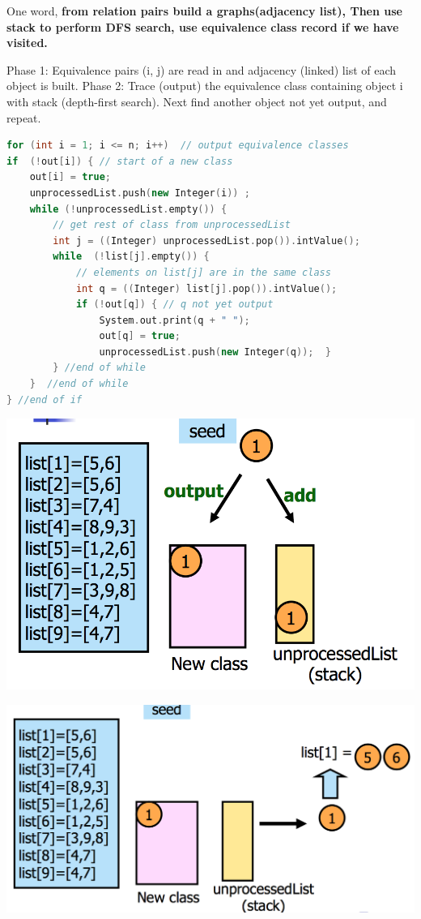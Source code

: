 \documentclass[a4paper,11pt,twoside]{book}
\begin{document}
	
	
	\par One word, \textbf{from relation pairs build a graphs(adjacency list), Then use stack to perform DFS search, use equivalence class record if we have visited.}
	
	
	
	Phase 1: Equivalence pairs (i, j) are read in and adjacency (linked) list of each object is built. Phase 2: Trace (output) the equivalence class containing object i with stack (depth-first search). Next find another object not yet output, and repeat.
	
\begin{lstlisting}[frame=single, language=c++, basicstyle=\scriptsize]
for (int i = 1; i <= n; i++)  // output equivalence classes
if  (!out[i]) { // start of a new class
	out[i] = true;
	unprocessedList.push(new Integer(i)) ;
	while (!unprocessedList.empty()) { 
		// get rest of class from unprocessedList
		int j = ((Integer) unprocessedList.pop()).intValue();
		while  (!list[j].empty()) { 
			// elements on list[j] are in the same class
			int q = ((Integer) list[j].pop()).intValue();
			if (!out[q]) { // q not yet output
				System.out.print(q + " ");
				out[q] = true;
				unprocessedList.push(new Integer(q));  }
		} //end of while
	}  //end of while 
} //end of if	
\end{lstlisting}	
	
\begin{minipage}{.5\textwidth}	
		\includegraphics[scale=0.35]{pics/offline_1.png} 
\end{minipage}
\begin{minipage}{.5\textwidth}	
	\includegraphics[scale=0.35]{pics/offline_2.png}  
\end{minipage}
\end{document}
